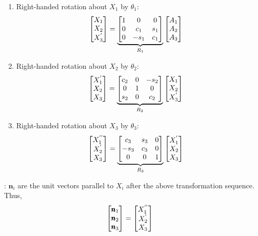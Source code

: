 \begin{multicols}{2}
 \begin{enumerate}
    \item Right-handed rotation about $X_1$ by $\theta_1$:
    \begin{align*}
        \begin{bmatrix} X_1\\ X_2\\ X_3^{'} \end{bmatrix} &=
        \underbrace{\begin{bmatrix} 1 & 0 & 0\\
                        0 & c_1 & s_1\\
                        0 & -s_1 & c_1 \end{bmatrix}}_{R_1}
        \begin{bmatrix} A_1\\ A_2\\ A_3 \end{bmatrix}
    \end{align*}
    \item Right-handed rotation about $X_2$ by $\theta_2$:
    \begin{align*}
        \begin{bmatrix} X_1^{'}\\ X_2\\ X_3 \end{bmatrix} &=
        \underbrace{\begin{bmatrix} c_2 & 0 & -s_2\\
                        0 & 1 & 0\\
                        s_2 & 0 & c_2 \end{bmatrix}}_{R_2}
        \begin{bmatrix} X_1\\ X_2\\ X_3^{'} \end{bmatrix}
    \end{align*}
    \item Right-handed rotation about $X_3$ by $\theta_3$:
    \begin{align*}
        \begin{bmatrix} X_1^{''}\\ X_2^{'}\\ X_3 \end{bmatrix} &=
        \underbrace{\begin{bmatrix} c_3 & s_3 & 0\\
                        -s_3 & c_3 & 0\\
                        0 & 0 & 1 \end{bmatrix}}_{R_3}
        \begin{bmatrix} X_1^{'}\\ X_2\\ X_3 \end{bmatrix}
    \end{align*}
\end{enumerate}

: $\pmb n_i$ are the unit vectors parallel to $X_i$ after the above transformation sequence.\\
Thus,
\begin{align*}
    \begin{bmatrix} \pmb n_1 \\ \pmb n_2 \\ \pmb n_3 \end{bmatrix} &= \begin{bmatrix} X_1^{''}\\ X_2^{'}\\ X_3 \end{bmatrix}
\end{align*}
\end{multicols}

